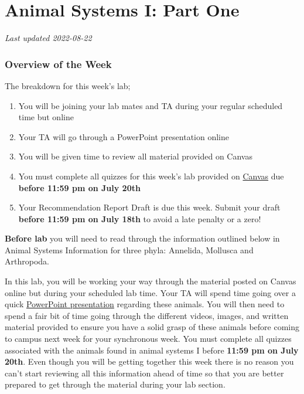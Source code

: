 \documentclass[
]{book}
\providecommand{\tightlist}{%
  \setlength{\itemsep}{0pt}\setlength{\parskip}{0pt}}
\begin{document}
\hypertarget{animal-systems-i-part-one}{%
\chapter*{Animal Systems I: Part One}\label{animal-systems-i-part-one}}

\emph{Last updated 2022-08-22}

\hypertarget{overview-of-the-week}{%
\subsection*{Overview of the Week}\label{overview-of-the-week}}

The breakdown for this week's lab;

\begin{enumerate}
\def\labelenumi{\arabic{enumi}.}
\tightlist
\item
  You will be joining your lab mates and TA during your regular scheduled time but online
\item
  Your TA will go through a PowerPoint presentation online
\item
  You will be given time to review all material provided on Canvas
\item
  You must complete all quizzes for this week's lab provided on \href{https://canvas.ubc.ca/}{Canvas} due \textbf{before 11:59 pm on July 20th}
\item
  Your Recommendation Report Draft is due this week. Submit your draft \textbf{before 11:59 pm on July 18th} to avoid a late penalty or a zero!
\end{enumerate}

\textbf{Before lab} you will need to read through the information outlined below in Animal Systems Information for three phyla: Annelida, Mollusca and Arthropoda.

In this lab, you will be working your way through the material posted on Canvas online but during your scheduled lab time. Your TA will spend time going over a quick \href{files/Animal_Systems_I_Presentation.pptx}{PowerPoint presentation} regarding these animals. You will then need to spend a fair bit of time going through the different videos, images, and written material provided to ensure you have a solid grasp of these animals before coming to campus next week for your synchronous week. You must complete all quizzes associated with the animals found in animal systems I before \textbf{11:59 pm on July 20th}. Even though you will be getting together this week there is no reason you can't start reviewing all this information ahead of time so that you are better prepared to get through the material during your lab section.
\end{document}
